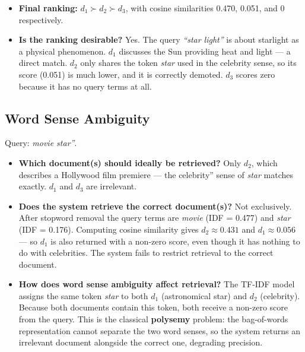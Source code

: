 \documentclass{article}
\begin{document}
\begin{itemize}[noitemsep]
    \item \textbf{Final ranking:} $d_1 \succ d_2 \succ d_3$, with cosine similarities 0.470, 0.051, and 0 respectively.
    \item \textbf{Is the ranking desirable?} Yes. The query \textit{``star light''} is about starlight as a physical phenomenon. $d_1$ discusses the Sun providing heat and light --- a direct match. $d_2$ only shares the token \textit{star} used in the celebrity sense, so its score (0.051) is much lower, and it is correctly demoted. $d_3$ scores zero because it has no query terms at all.
\end{itemize}

\subsection{Word Sense Ambiguity}

Query: \textit{movie star''}.

\begin{itemize}[noitemsep]
    \item \textbf{Which document(s) should ideally be retrieved?} Only $d_2$, which describes a Hollywood film premiere --- the celebrity'' sense of \textit{star} matches exactly. $d_1$ and $d_3$ are irrelevant.

    \item \textbf{Does the system retrieve the correct document(s)?} Not exclusively. After stopword removal the query terms are \textit{movie} (IDF = 0.477) and \textit{star} (IDF = 0.176). Computing cosine similarity gives $d_2 \approx 0.431$ and $d_1 \approx 0.056$ --- so $d_1$ is also returned with a non-zero score, even though it has nothing to do with celebrities. The system fails to restrict retrieval to the correct document.

    \item \textbf{How does word sense ambiguity affect retrieval?} The TF-IDF model assigns the same token \textit{star} to both $d_1$ (astronomical star) and $d_2$ (celebrity). Because both documents contain this token, both receive a non-zero score from the query. This is the classical \textbf{polysemy} problem: the bag-of-words representation cannot separate the two word senses, so the system returns an irrelevant document alongside the correct one, degrading precision.
\end{itemize}

\end{document}
